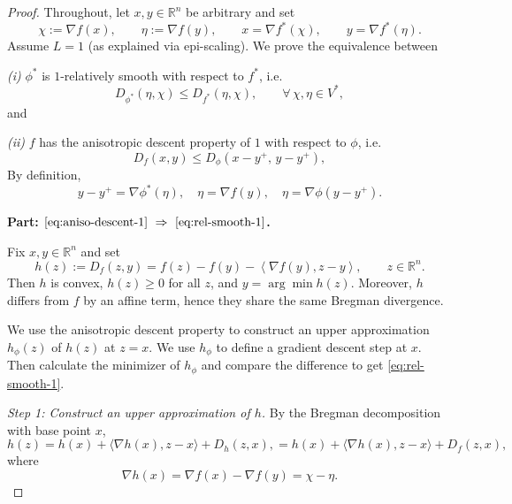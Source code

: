 \documentclass[10pt,a4paper]{amsart}
\newcommand{\dual}[1]{\left\langle {#1} \right\rangle}
\providecommand{\paragraph}{}
\begin{document}
\begin{proof}
Throughout, let $x,y\in\mathbb{R}^n$ be arbitrary and set
\[
\chi:=\nabla f(x),\qquad \eta:=\nabla f(y),
\qquad x=\nabla f^*(\chi),\qquad y=\nabla f^*(\eta).
\]
Assume $L=1$ (as explained via epi-scaling). We prove the equivalence between

\smallskip
\noindent\emph{(i)} $\phi^*$ is $1$-relatively smooth with respect to $f^*$, i.e.
\begin{equation}\label{eq:rel-smooth-1}
D_{\phi^*}(\eta, \chi)\le D_{f^*}(\eta, \chi),\qquad \forall\,\chi,\eta\in V^*,
\end{equation}
and

\smallskip
\noindent\emph{(ii)} $f$ has the anisotropic descent property of $1$ with respect to $\phi$, i.e.
\begin{equation}\label{eq:aniso-descent-1}
D_f(x,y)\le D_{\phi}(x-y^+,\,y-y^+),
\end{equation}
By definition,
\[
y-y^+ = \nabla \phi^*(\eta), \quad \eta = \nabla f(y), \quad \eta = \nabla \phi(y-y^+).
\]

{\bf Part: $\eqref{eq:aniso-descent-1}\ \Rightarrow\ \eqref{eq:rel-smooth-1}$.}


Fix $x,y\in\mathbb{R}^n$ and set
\[
h(z):=D_f(z,y) = f(z) - f(y) - \dual{\nabla f(y), z - y},\qquad z\in\mathbb{R}^n.
\]
Then $h$ is convex, $h(z)\ge 0$ for all $z$, and $y = \arg\min h(z)$.
Moreover, $h$ differs from $f$ by an affine term, hence they share the same Bregman divergence.

We use the anisotropic descent property to construct an upper approximation $h_{\phi}(z)$ of $h(z)$ at $z = x$. We use $h_{\phi}$ to define a gradient descent step at $x$. Then calculate the minimizer of $h_{\phi}$ and compare the difference to get \eqref{eq:rel-smooth-1}.

\medskip

\paragraph{\em Step 1: Construct an upper approximation of $h$.}
By the Bregman decomposition with base point $x$,
\begin{equation}\label{eq:h-bregman}
h(z)
=
h(x)+\langle \nabla h(x),z-x\rangle + D_h(z,x),
=
h(x)+\langle \nabla h(x),z-x\rangle + D_f(z,x),
\end{equation}
where
\[
\nabla h(x)=\nabla f(x)-\nabla f(y)=\chi - \eta.
\]


\end{proof}
\end{document}
